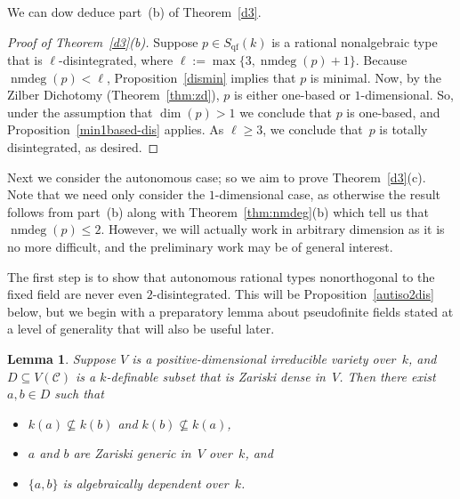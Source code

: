 \documentclass[\DocOpts]{amsart}
\newtheorem{lemma}[theorem]{Lemma}
\theoremstyle{definition}
\def\qf{\operatorname{qf}}
\def\nmdeg{\operatorname{nmdeg}}
\def\C{\mathcal{C}}
\newcommand{\kk}{k}
\newcommand{\Set}[1]{\{#1\}}
\newcommand{\<}{\langle}
\renewcommand{\>}{\rangle}
\begin{document}
We can dow deduce part~(b) of Theorem~\ref{d3}.

\begin{proof}[Proof of Theorem~\ref{d3}(b)]
Suppose $p\in S_{\qf}(k)$ is a rational nonalgebraic type that is $\ell$-disintegrated, where $\ell:=\max\{3, \nmdeg(p)+1\}$.
Because $\nmdeg(p)<\ell$, Proposition~\ref{dismin} implies that $p$ is minimal.
Now, by the Zilber Dichotomy (Theorem~\ref{thm:zd}), $p$ is either one-based or $1$-dimensional.
So, under the assumption that $\dim (p)>1$ we conclude that $p$ is one-based, and Proposition~\ref{min1based-dis} applies.
As $\ell\geq 3$, we conclude that~$p$ is totally disintegrated, as desired.
\end{proof}

Next we consider the autonomous case; so we aim to prove Theorem~\ref{d3}(c).
Note that we need only consider the $1$-dimensional case, as otherwise the result follows from part~(b) along with Theorem~\ref{thm:nmdeg}(b) which tell us that $\nmdeg(p)\leq 2$.
However, we will actually work in arbitrary dimension as it is no more difficult, and the preliminary work may be of general interest.

The first step is to show that autonomous rational types nonorthogonal to the fixed field are never even $2$-disintegrated.
This will be Proposition~\ref{autiso2dis} below, but we begin with a preparatory lemma about pseudofinite fields stated at a level of generality that will also be useful later.

\begin{lemma}
\label{psf-not2dis}
Suppose \(V\) is a positive-dimensional irreducible variety 
over~\(k\), and \(D\subseteq{}V(\C)\) is a \(\kk\)-definable subset that 
is Zariski dense in~\(V\).
Then there exist \(a,b \in{}D\) such that
\begin{itemize}
\item[(i)]
 $k(a)\not\subseteq k(b)$ and $k(b)\not\subseteq k(a)$,
 \item[(ii)]
 $a$ and $b$ are Zariski generic in~\(V\) over~\(\kk\), and
 \item[(iii)]
 \(\Set{a,b}\) is algebraically dependent over~\(\kk\).
 \end{itemize}
\end{lemma}
\end{document}
